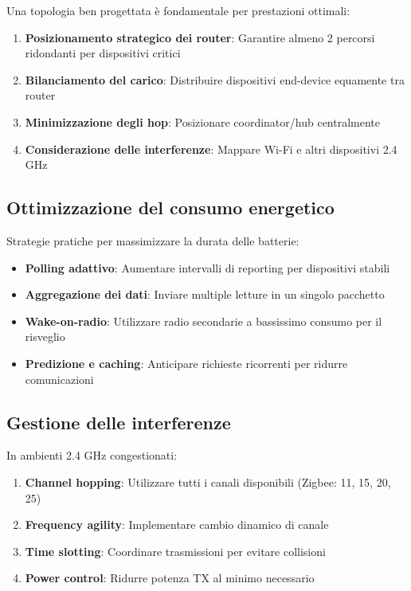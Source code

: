 Una topologia ben progettata è fondamentale per prestazioni ottimali:

\begin{enumerate}
    \item \textbf{Posizionamento strategico dei router}: Garantire almeno 2 percorsi ridondanti per dispositivi critici
    \item \textbf{Bilanciamento del carico}: Distribuire dispositivi end-device equamente tra router
    \item \textbf{Minimizzazione degli hop}: Posizionare coordinator/hub centralmente
    \item \textbf{Considerazione delle interferenze}: Mappare Wi-Fi e altri dispositivi 2.4 GHz
\end{enumerate}

\subsection{Ottimizzazione del consumo energetico}

Strategie pratiche per massimizzare la durata delle batterie:

\begin{itemize}
    \item \textbf{Polling adattivo}: Aumentare intervalli di reporting per dispositivi stabili
    \item \textbf{Aggregazione dei dati}: Inviare multiple letture in un singolo pacchetto
    \item \textbf{Wake-on-radio}: Utilizzare radio secondarie a bassissimo consumo per il risveglio
    \item \textbf{Predizione e caching}: Anticipare richieste ricorrenti per ridurre comunicazioni
\end{itemize}

\subsection{Gestione delle interferenze}

In ambienti 2.4 GHz congestionati:

\begin{enumerate}
    \item \textbf{Channel hopping}: Utilizzare tutti i canali disponibili (Zigbee: 11, 15, 20, 25)
    \item \textbf{Frequency agility}: Implementare cambio dinamico di canale
    \item \textbf{Time slotting}: Coordinare trasmissioni per evitare collisioni
    \item \textbf{Power control}: Ridurre potenza TX al minimo necessario
\end{enumerate}

